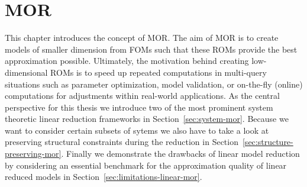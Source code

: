 \chapter{\acl{MOR}}\label{chap:linear-mor}

This chapter introduces the concept of \ac{MOR}.
The aim of MOR is to create models of smaller dimension from \acp{FOM} such that these \acp{ROM} provide the best approximation possible.
Ultimately, the motivation behind creating low-dimensional ROMs is to speed up repeated computations in multi-query situations such as parameter optimization, model validation, or on-the-fly (online) computations for adjustments within real-world applications.
As the central perspective for this thesis we introduce two of the most prominent system theoretic linear reduction frameworks in Section~\ref{sec:system-mor}.
Because we want to consider certain subsets of sytems we also have to take a look at preserving structural constraints during the reduction in Section~\ref{sec:structure-preserving-mor}.
Finally we demonstrate the drawbacks of linear model reduction by considering an essential benchmark for the approximation quality of linear reduced models in Section~\ref{sec:limitations-linear-mor}.




